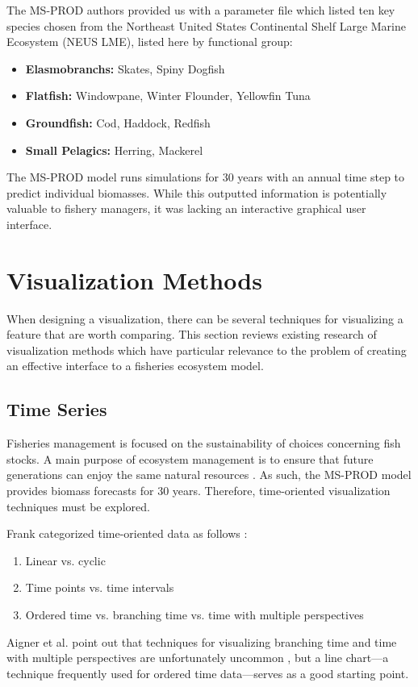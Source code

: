 The MS-PROD authors provided us with a parameter file which listed ten key species chosen from the Northeast United States Continental Shelf Large Marine Ecosystem (NEUS LME), listed here by functional group:%
\begin{itemize}
	\item \textbf{Elasmobranchs:} Skates, Spiny Dogfish
	\item \textbf{Flatfish:} Windowpane, Winter Flounder, Yellowfin Tuna
	\item \textbf{Groundfish:} Cod, Haddock, Redfish
	\item \textbf{Small Pelagics:} 	Herring, Mackerel
\end{itemize}
The MS-PROD model runs simulations for 30 years with an annual time step to predict individual biomasses.  While this outputted information is potentially valuable to fishery managers, it was lacking an interactive graphical user interface.  

\section{Visualization Methods}

When designing a visualization, there can be several techniques for visualizing a feature that are worth comparing.  This section reviews existing research of visualization methods which have particular relevance to the problem of creating an effective interface to a fisheries ecosystem model.

\subsection{Time Series}

Fisheries management is focused on the sustainability of choices concerning fish stocks.  A main purpose of ecosystem management is to ensure that future generations can enjoy the same natural resources \cite{christensen1996}.  As such, the MS-PROD model provides biomass forecasts for 30 years.  Therefore, time-oriented visualization techniques must be explored.

Frank categorized time-oriented data as follows \cite{frank1998}: 
\begin{enumerate}
	\item Linear vs. cyclic
	\item Time points vs. time intervals
	\item Ordered time vs. branching time vs. time with multiple perspectives
\end{enumerate}
Aigner et al. point out that techniques for visualizing branching time and time with multiple perspectives are unfortunately uncommon \cite{aigner2008}, but a line chart---a technique frequently used for ordered time data---serves as a good starting point.

